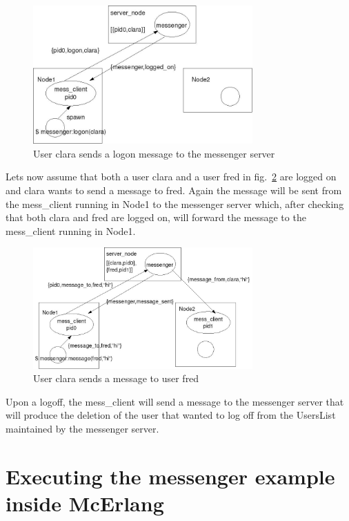 \documentclass[a4paper]{article}
\begin{document}
\begin{figure}[Htbp]
\begin{center}
   \includegraphics*[width=0.75\textwidth]{logon}
   \caption{User clara sends a logon message to the messenger server}
   \label{logon}
\end{center}
\end{figure}

Lets now assume that both a user clara and a user fred in
fig.\ \ref{send} are logged on and clara wants to send a message to
fred. Again the message will be sent from the mess\_client running in
Node1 to the messenger server which, after checking that both clara
and fred are logged on, will forward the message to the mess\_client
running in Node1.

\begin{figure}[Htbp]
\begin{center}
   \includegraphics*[width=0.75\textwidth]{send}
   \caption{User clara sends a message to user fred}
   \label{send}
\end{center}
\end{figure}

Upon a logoff, the mess\_client will send a message to the messenger
server that will produce the deletion of the user that wanted to log
off from the UsersList maintained by the messenger server.

\section{Executing the messenger example inside McErlang}
\end{document}

